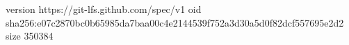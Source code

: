 version https://git-lfs.github.com/spec/v1
oid sha256:e07c2870bc0b65985da7baa00c4e2144539f752a3d30a5d0f82dcf557695e2d2
size 350384
